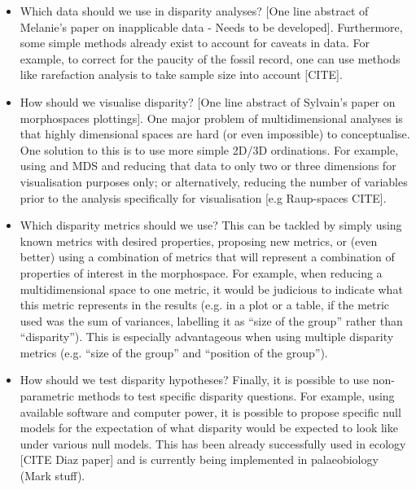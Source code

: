 \documentclass[12pt,letterpaper]{article}
\begin{document}
\begin{itemize}
    \item{Which data should we use in disparity analyses?}
    [One line abstract of Melanie's paper on inapplicable data - Needs to be developed].
    Furthermore, some simple methods already exist to account for caveats in data. 
    For example, to correct for the paucity of the fossil record, one can use methods like rarefaction analysis to take sample size into account [CITE].
    \item{How should we visualise disparity?} %
    [One line abstract of Sylvain's paper on morphospaces plottings].
    One major problem of multidimensional analyses is that highly dimensional spaces are hard (or even impossible) to conceptualise.
    One solution to this is to use more simple 2D/3D ordinations.
    For example, using and MDS and reducing that data to only two or three dimensions for visualisation purposes only; or alternatively, reducing the number of variables prior to the analysis specifically for visualisation [e.g Raup-spaces CITE].
    \item{Which disparity metrics should we use?}
    This can be tackled by simply using known metrics with desired properties, proposing new metrics, or (even better) using a combination of metrics that will represent a combination of properties of interest in the morphospace.
    For example, when reducing a multidimensional space to one metric, it would be judicious to indicate what this metric represents in the results (e.g. in a plot or a table, if the metric used was the sum of variances, labelling it as ``size of the group'' rather than ``disparity'').
    This is especially advantageous when using multiple disparity metrics (e.g. ``size of the group'' and ``position of the group'').
    \item{How should we test disparity hypotheses?}
    Finally, it is possible to use non-parametric methods to test specific disparity questions.
    For example, using available software and computer power, it is possible to propose specific null models for the expectation of what disparity would be expected to look like under various null models.
    This has been already successfully used in ecology [CITE Diaz paper] and is currently being implemented in palaeobiology (Mark stuff).
\end{itemize}
\end{document}
